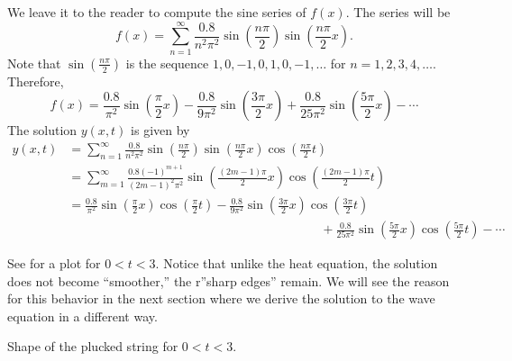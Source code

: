 \documentclass{ximera}
\begin{document}
\begin{example}
    We leave it to the reader to compute the sine series of $f(x)$.  The series will be
    \begin{equation*}
        f(x) = \sum_{n=1}^\infty \frac{0.8}{n^2 \pi^2} \sin \left( \frac{n \pi}{2} \right) \sin \left( \frac{n \pi}{2} x \right) .
    \end{equation*}
    Note that $\sin \left( \frac{n \pi}{2} \right)$ is the sequence $1, 0, -1, 0, 1, 0, -1, \ldots$ for $n = 1,2,3,4,\ldots$.  Therefore,
    \begin{equation*}
        f(x) =  \frac{0.8}{\pi^2} \sin \left( \frac{\pi}{2} x \right) - \frac{0.8}{9 \pi^2} \sin \left( \frac{3 \pi}{2} x \right) + \frac{0.8}{25 \pi^2} \sin \left( \frac{5 \pi}{2} x \right) - \cdots
    \end{equation*}
    The solution $y(x,t)$ is given by
    \begin{equation*}
        \begin{split}
            y(x,t) & = \sum_{n=1}^\infty \frac{0.8}{n^2 \pi^2} \sin \left( \frac{n \pi}{2} \right) \sin \left( \frac{n \pi}{2} x \right) \cos \left( \frac{n \pi}{2} t \right) \\
            & = \sum_{m=1}^\infty \frac{0.8 {(-1)}^{m+1}}{{(2m-1)}^2 \pi^2} \sin \left( \frac{(2m-1) \pi}{2} x \right)\cos \left( \frac{(2m-1) \pi}{2} t \right) \\
            & =\frac{0.8}{\pi^2} \sin \left( \frac{\pi}{2}  x \right) \cos \left( \frac{\pi}{2}  t \right) - \frac{0.8}{9 \pi^2} \sin \left( \frac{3 \pi}{2}  x \right) \cos \left( \frac{3 \pi}{2}  t \right) \\
            & \hspace{20em} + \frac{0.8}{25 \pi^2} \sin \left( \frac{5 \pi}{2}  x \right) \cos \left( \frac{5 \pi}{2}  t \right)  - \cdots
        \end{split}
    \end{equation*}
    
    See  for a plot for $0 < t < 3$.  Notice that unlike the heat equation, the solution does not become ``smoother,'' the r''sharp edges'' remain.  We will see the reason for this behavior in the next section where we derive the solution to the wave equation in a different way.
    
    \begin{myfig}
        \capstart
        \caption{Shape of the plucked string for $0 < t < 3$.\label{wave:pluckedexfig}}
    \end{myfig}
    

\end{example}
\end{document}
